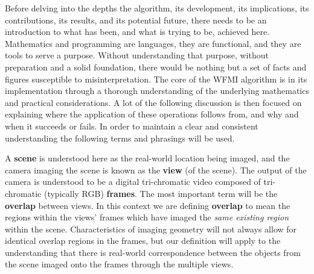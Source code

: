 %
%
%
%
%
%
%
%
%

%
%
%


Before delving into the depths the algorithm, its development, its implications, its contributions, its results, and its potential future, there needs to be an introduction to what has been, and what is trying to be, achieved here. Mathematics and programming are languages, they are functional, and they are tools to serve a purpose. Without understanding that purpose, without preparation and a solid foundation, there would be nothing but a set of facts and figures susceptible to misinterpretation. The core of the WFMI algorithm is in its implementation through a thorough understanding of the underlying mathematics and practical considerations. A lot of the following discussion is then focused on explaining where the application of these operations follows from, and why and when it succeeds or fails. In order to maintain a clear and consistent understanding the following terms and phrasings will be used.

A \textbf{scene} is understood here as the real-world location being imaged, and the camera imaging the scene is known as the \textbf{view} (of the scene). The output of the camera is understood to be a digital tri-chromatic video composed of tri-chromatic (typically RGB) \textbf{frames}. The most important term will be the \textbf{overlap} between views. In this context we are defining \textbf{overlap} to mean the regions within the views' frames which have imaged the \textit{same existing region} within the scene. Characteristics of imaging geometry will not always allow for identical overlap regions in the frames, but our definition will apply to the understanding that there is real-world correspondence between the objects from the scene imaged onto the frames through the multiple views.

